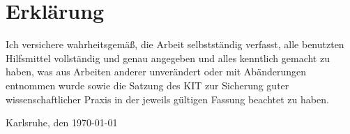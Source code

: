\documentclass[11pt]{scrartcl}
\begin{document}
	\newpage
	
	
	\pagestyle{plain}
	\listoffigures
	
	
	
	
	
	
	
	
	\newpage
	
	\printbibliography[heading=bibintoc,title={Literaturverzeichnis}]
	\pagestyle{plain}
	
	\newpage
	
	\section*{Erklärung}
	
	Ich versichere wahrheitsgemäß, die Arbeit selbstständig verfasst, alle benutzten
	Hilfsmittel vollständig und genau angegeben und alles kenntlich gemacht zu
	haben, was aus Arbeiten anderer unverändert oder mit Abänderungen entnommen
	wurde sowie die Satzung des KIT zur Sicherung guter wissenschaftlicher Praxis in
	der jeweils gültigen Fassung beachtet zu haben.
	
	\vspace{3cm}
	
	\hspace{0.5cm} Karlsruhe, den \today
	
	
	
\end{document}
